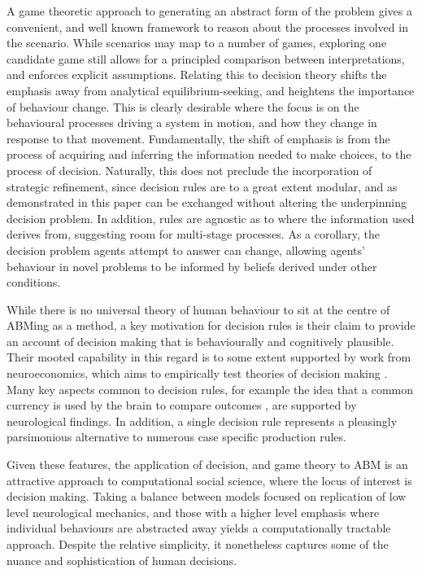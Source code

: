 
A game theoretic approach to generating an abstract form of the problem gives a convenient, and well known framework to reason about the processes involved in the scenario. While scenarios may map to a number of games, exploring one candidate game still allows for a principled comparison between interpretations, and enforces explicit assumptions. Relating this to decision theory shifts the emphasis away from analytical equilibrium-seeking, and heightens the importance of behaviour change. This is clearly desirable where the focus is on the behavioural processes driving a system in motion, and how they change in response to that movement.
Fundamentally, the shift of emphasis is from the process of acquiring and inferring the information needed to make choices, to the process of decision.
Naturally, this does not preclude the incorporation of strategic refinement, since decision rules are to a great extent modular, and as demonstrated in this paper can be exchanged without altering the underpinning decision problem. In addition, rules are agnostic as to where the information used derives from, suggesting room for multi-stage processes.  As a corollary, the decision problem agents attempt to answer can change, allowing agents' behaviour in novel problems to be informed by beliefs derived under other conditions. 

While there is no universal theory of human behaviour to sit at the centre of \ac{ABM}ing as a method, a key motivation for decision rules is their claim to provide an account of decision making that is behaviourally and cognitively plausible. Their mooted capability in this regard is to some extent supported by work from neuroeconomics, which aims to empirically test theories of decision making \citep{Rustichini2009}. Many key aspects common to decision rules, for example the idea that a common currency is used by the brain to compare outcomes \citep{Padoa-Schioppa2006,Padoa-Schioppa2008}, are supported by neurological findings. In addition, a single decision rule represents a pleasingly parsimonious alternative to numerous case specific production rules. 

Given these features, the application of decision, and game theory to \ac{ABM} is an attractive approach to computational social science, where the locus of interest is decision making. Taking a balance between models focused on replication of low level neurological mechanics, and those with a higher level emphasis where individual behaviours are abstracted away yields a computationally tractable approach. Despite the relative simplicity, it nonetheless captures some of the nuance and sophistication of human decisions.

